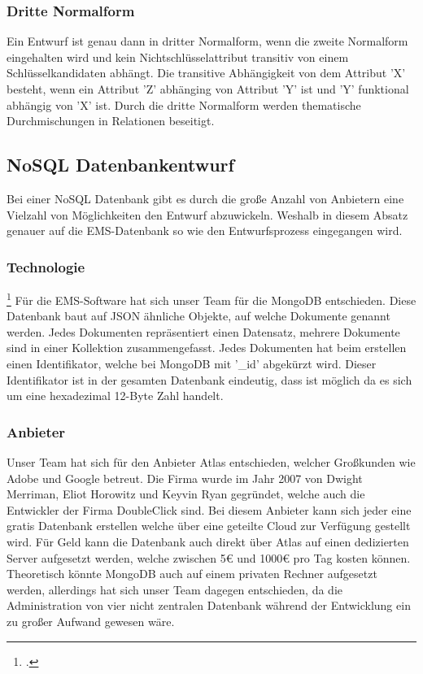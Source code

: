 			\subsubsection{Dritte Normalform}
				Ein Entwurf ist genau dann in dritter Normalform, wenn die zweite Normalform eingehalten wird und kein Nichtschlüsselattribut transitiv von einem Schlüsselkandidaten abhängt. 
				Die transitive Abhängigkeit von dem Attribut 'X' besteht, wenn ein Attribut 'Z' abhänging von Attribut 'Y' ist und 'Y' funktional abhängig von 'X' ist. 
				Durch die dritte Normalform werden thematische Durchmischungen in Relationen beseitigt. 		
		\subsection{NoSQL Datenbankentwurf}
			Bei einer NoSQL Datenbank gibt es durch die große Anzahl von Anbietern eine Vielzahl von Möglichkeiten den Entwurf abzuwickeln. 
			Weshalb in diesem Absatz genauer auf die EMS-Datenbank so wie den Entwurfsprozess eingegangen wird. 
			\subsubsection{Technologie} \footcite{mongohistory}
				Für die EMS-Software hat sich unser Team für die MongoDB entschieden. Diese Datenbank baut auf JSON ähnliche Objekte, auf welche Dokumente genannt werden. 
				Jedes Dokumenten repräsentiert einen Datensatz, mehrere Dokumente sind in einer Kollektion zusammengefasst. 
				Jedes Dokumenten hat beim erstellen einen Identifikator, welche bei MongoDB mit '\_id' abgekürzt wird. 
				Dieser Identifikator ist in der gesamten Datenbank eindeutig, dass ist möglich da es sich um eine hexadezimal 12-Byte Zahl handelt. 
			\subsubsection{Anbieter}
				Unser Team hat sich für den Anbieter Atlas entschieden, welcher Großkunden wie Adobe und Google betreut. 
				Die Firma wurde im Jahr 2007 von Dwight Merriman, Eliot Horowitz und Keyvin Ryan gegründet, welche auch die Entwickler der Firma DoubleClick sind. 
				Bei diesem Anbieter kann sich jeder eine gratis Datenbank erstellen welche über eine geteilte Cloud zur Verfügung gestellt wird. 
				Für Geld kann die Datenbank auch direkt über Atlas auf einen dedizierten Server aufgesetzt werden, welche zwischen 5€ und 1000€ pro Tag kosten können. 
				Theoretisch könnte MongoDB auch auf einem privaten Rechner aufgesetzt werden, allerdings hat sich unser Team dagegen entschieden, da die Administration von vier nicht zentralen Datenbank während der Entwicklung ein zu großer Aufwand gewesen wäre.
